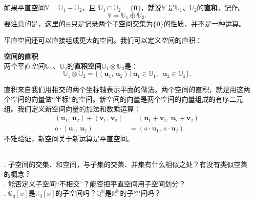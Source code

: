 \documentclass[12pt,UTF8,fontset=none]{ctexbook}
\begin{document}
如果平直空间$\mathbb{V} = \mathbb{U}_1 + \mathbb{U}_2$，且
$\mathbb{U}_1 \cap \mathbb{U}_2 = \{\mathbf{0}\}$，就说$\mathbb{V}$
是$\mathbb{U}_1$、$\mathbb{U}_2$的\textbf{直和}，记作。
$$\mathbb{V} = \mathbb{U}_1 \oplus \mathbb{U}_2.$$
要注意的是，这里的$\oplus$只是记录两个子空间交集为$\{\mathbf{0}\}$的性质，并不是一种运算。

平直空间还可以直接组成更大的空间。我们可以定义空间的直积：

\begin{df}{\textbf{空间的直积}}
    \mbox{} \\
    两个平直空间$\mathbb{U}_1$、$\mathbb{U}_2$的\textbf{直积空间}$\mathbb{U}_1 \otimes \mathbb{U}_2$是：
    $$ \mathbb{U}_1 \otimes \mathbb{U}_2 = \{ (\mathbf{u}_1, \, \mathbf{u}_2) \,|\, \mathbf{u}_1 \in \mathbb{U}_1,\,\,\, \mathbf{u}_2 \in \mathbb{U}_2\}.$$
\end{df}

直积来自我们用相交的两个坐标轴表示平面的做法。两个空间的直积，就是用这两个空间的向量做“坐标”的空间。新空间的向量是两个空间的向量组成的有序二元组。我们定义新空间向量的加法和数乘运算：
\begin{align*}
    (\mathbf{u}_1, \, \mathbf{u}_2) + (\mathbf{v}_1, \, \mathbf{v}_2) &= (\mathbf{u}_1 + \mathbf{v}_1, \, \mathbf{u}_2 + \mathbf{v}_2) \\
    a \cdot (\mathbf{u}_1, \, \mathbf{u}_2) &= (a\cdot \mathbf{u}_1, \, a \cdot \mathbf{u}_2) 
\end{align*}
不难验证，新空间关于新运算是平直空间。

\begin{sk}
    \mbox{} \\
    . 子空间的交集、和空间，与子集的交集、并集有什么相似之处？有没有类似空集的概念？\\
    . 能否定义子空间“不相交”？能否把平直空间用子空间划分？\\
    . $\mathbb{Q}_3[x]$是$\mathbb{R}_3[x]$的子空间吗？$\mathbb{Q}^\mathbb{N}$是$\mathbb{R}^\mathbb{N}$的子空间吗？
\end{sk}
\end{document}
